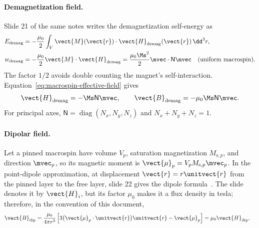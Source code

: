 \paragraph{Demagnetization field.}
Slide 21 of the same notes writes the demagnetization self-energy
as~\cite{ee237-week5}
\begin{align}
    E_{\mathrm{demag}}
     & =-\frac{\mu_0}{2}\int_V
    \vect{M}(\vect{r})\cdot\vect{H}_{\mathrm{demag}}(\vect{r})
    \,\dd^3r,
    \label{eq:macrospin-demag-energy-integral}                 \\
    w_{\mathrm{demag}}
     & =-\frac{\mu_0}{2}\vect{M}\cdot\vect{H}_{\mathrm{demag}}
    =\frac{\mu_0\Ms^2}{2}\mvec\cdot\mathsf{N}\mvec
    \quad\text{(uniform macrospin)}.
    \label{eq:macrospin-demag-energy-density}
\end{align}
The factor $1/2$ avoids double counting the magnet's self-interaction.
Equation~\eqref{eq:macrospin-effective-field} gives
\begin{equation}
    \vect{H}_{\mathrm{demag}}
    =-\Ms\mathsf{N}\mvec,
    \qquad
    \vect{B}_{\mathrm{demag}}
    =-\mu_0\Ms\mathsf{N}\mvec.
    \label{eq:macrospin-demag-field}
\end{equation}
For principal axes,
$\mathsf{N}=\operatorname{diag}(N_x,N_y,N_z)$ and
$N_x+N_y+N_z=1$.

\paragraph{Dipolar field.}
Let a pinned macrospin have volume $V_p$, saturation magnetization
$M_{\mathrm{s},p}$, and direction $\mvec_p$, so its magnetic moment is
$\vect{\mu}_p=V_pM_{\mathrm{s},p}\mvec_p$.
In the point-dipole approximation, at displacement
$\vect{r}=r\unitvect{r}$ from the pinned layer to the free layer, slide 22
gives the dipole formula~\cite{ee237-week5}.  The slide denotes it by
$\vect{H}_i$, but its factor $\mu_0$ makes it a flux density in tesla;
therefore, in the convention of this document,
\begin{align}
    \vect{B}_{\mathrm{dip}}
     & =\frac{\mu_0}{4\pi r^3}
    \left[3\bigl(\vect{\mu}_p\cdot\unitvect{r}\bigr)\unitvect{r}
        -\vect{\mu}_p\right]
    =\mu_0\vect{H}_{\mathrm{dip}},
    \label{eq:macrospin-dipole-flux-density}
\end{align}

